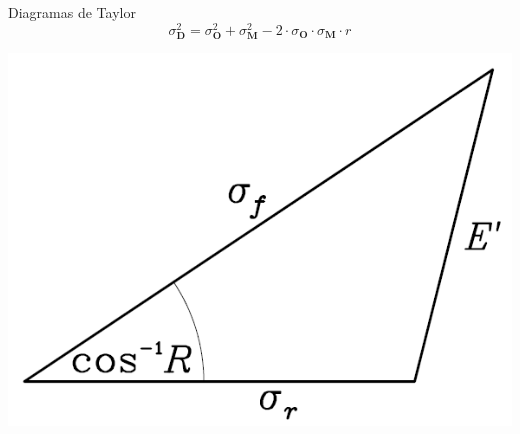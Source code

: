 \documentclass[xcolor={usenames,svgnames,dvipsnames}]{beamer}
\begin{document}
\begin{frame}[label={sec:org790f223}]{Diagramas de Taylor}
\[
\sigma^2_{\mathbf{D}} = \sigma^2_{\mathbf{O}}  + \sigma^2_{\mathbf{M}}
- 2 \cdot \sigma_{\mathbf{O}} \cdot \sigma_{\mathbf{M}} \cdot r 
\]

\begin{center}
\begin{center}
\includegraphics[width=.9\linewidth]{../figs/cosenosDiagramaTaylor.png}
\end{center}
\end{center}
\end{frame}
\end{document}

